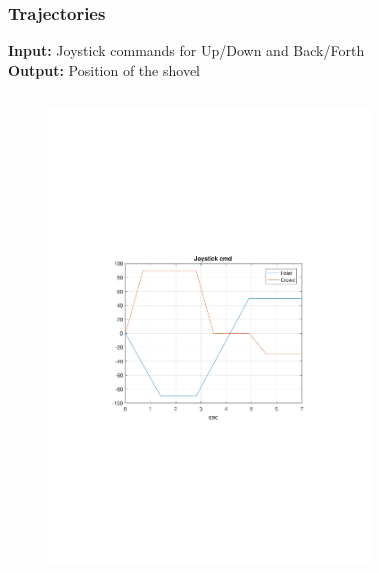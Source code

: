 \begin{frame}[c]
	\frametitle{Trajectories}
	\textbf{Input:} Joystick commands for Up/Down and Back/Forth \\
	\vspace{.4cm}
	\textbf{Output:} Position of the shovel
	\vspace{-.3cm}
	\begin{columns}[T]
		\begin{figure}
			\centering
			\includegraphics[trim=4cm 9cm 4cm 9.5cm, clip=true, width=\linewidth]{img/Joystick}
		\end{figure}
		\begin{figure}
			\centering

\end{figure}
\end{columns}
\end{frame}

